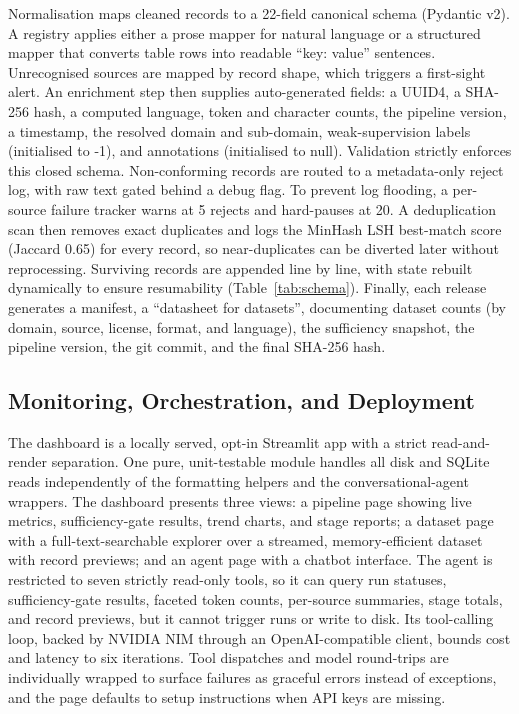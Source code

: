 \documentclass[conference]{IEEEtran}
\begin{document}
Normalisation maps cleaned records to a 22-field canonical schema (Pydantic v2). A registry applies either a prose mapper for natural language or a structured mapper that converts table rows into readable ``key: value'' sentences. Unrecognised sources are mapped by record shape, which triggers a first-sight alert. An enrichment step then supplies auto-generated fields: a UUID4, a SHA-256 hash, a computed language, token and character counts, the pipeline version, a timestamp, the resolved domain and sub-domain, weak-supervision labels (initialised to -1), and annotations (initialised to null). Validation strictly enforces this closed schema. Non-conforming records are routed to a metadata-only reject log, with raw text gated behind a debug flag. To prevent log flooding, a per-source failure tracker warns at 5 rejects and hard-pauses at 20. A deduplication scan then removes exact duplicates and logs the MinHash LSH best-match score (Jaccard 0.65) for every record, so near-duplicates can be diverted later without reprocessing. Surviving records are appended line by line, with state rebuilt dynamically to ensure resumability (Table~\ref{tab:schema}). Finally, each release generates a manifest, a ``datasheet for datasets'', documenting dataset counts (by domain, source, license, format, and language), the sufficiency snapshot, the pipeline version, the git commit, and the final SHA-256 hash.


\subsection{Monitoring, Orchestration, and Deployment}

The dashboard is a locally served, opt-in Streamlit app with a strict read-and-render separation. One pure, unit-testable module handles all disk and SQLite reads independently of the formatting helpers and the conversational-agent wrappers. The dashboard presents three views: a pipeline page showing live metrics, sufficiency-gate results, trend charts, and stage reports; a dataset page with a full-text-searchable explorer over a streamed, memory-efficient dataset with record previews; and an agent page with a chatbot interface. The agent is restricted to seven strictly read-only tools, so it can query run statuses, sufficiency-gate results, faceted token counts, per-source summaries, stage totals, and record previews, but it cannot trigger runs or write to disk. Its tool-calling loop, backed by NVIDIA NIM through an OpenAI-compatible client, bounds cost and latency to six iterations. Tool dispatches and model round-trips are individually wrapped to surface failures as graceful errors instead of exceptions, and the page defaults to setup instructions when API keys are missing.
\end{document}
